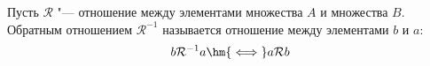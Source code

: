
    Пусть $\mathcal R$ "--- отношение между элементами множества $A$ и множества $B$. Обратным отношением $\mathcal R^{-1}$ 
    называется отношение между элементами $b$ и $a$:
    \[ b\mathcal R^{-1}a\hm{\iff} a\mathcal Rb\]

